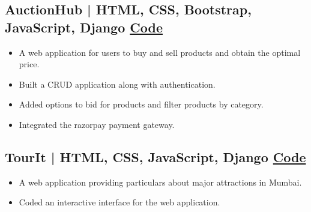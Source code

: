 \documentclass[10pt]{article}
\newenvironment{zitemize}{
\begin{itemize}\itemsep2pt \parskip0pt \parsep1pt}
{\end{itemize}\vspace{-0.5cm}}
\begin{document}
\subsection*{ AuctionHub | HTML, CSS, Bootstrap, JavaScript, Django \hfill \href{https://github.com/mihikagaonkar/tourit}{Code}} 
    \begin{zitemize}
        \item A  web  application  for users to buy and sell products and obtain the optimal price.
        \item Built a CRUD application along with authentication.
        \item Added options to bid for products and filter products by category.
        \item Integrated the razorpay payment gateway.
    \end{zitemize}

\subsection*{ TourIt | HTML, CSS, JavaScript, Django \hfill \href{https://github.com/mihikagaonkar/tourit}{Code}} 
    \begin{zitemize}
        \item A  web  application  providing  particulars  about  major attractions in Mumbai.
        \item Coded an interactive interface for the web application.
    \end{zitemize}
\end{document}
